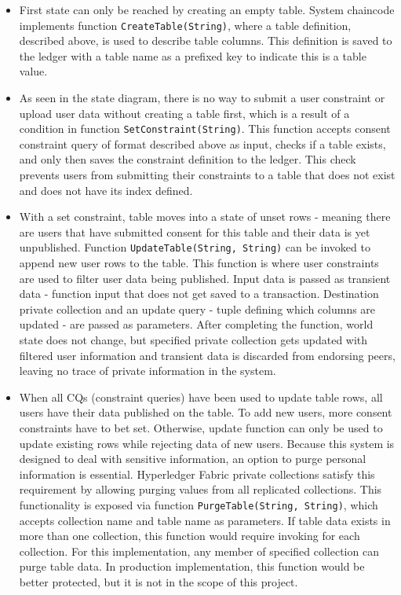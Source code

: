\documentclass[12pt]{article}
\begin{document}
    \begin{itemize}
        \item First state can only be reached by creating an empty table. System chaincode implements function \lstinline{CreateTable(String)}, where a table definition, described above, is used to describe table columns. This definition is saved to the ledger with a table name as a prefixed key to indicate this is a table value.

        \item As seen in the state diagram, there is no way to submit a user constraint or upload user data without creating a table first, which is a result of a condition in function \lstinline{SetConstraint(String)}. This function accepts consent constraint query of format described above as input, checks if a table exists, and only then saves the constraint definition to the ledger. This check prevents users from submitting their constraints to a table that does not exist and does not have its index defined.
        
        \item With a set constraint, table moves into a state of unset rows - meaning there are users that have submitted consent for this table and their data is yet unpublished. Function \lstinline{UpdateTable(String, String)} can be invoked to append new user rows to the table. This function is where user constraints are used to filter user data being published. Input data is passed as transient data - function input that does not get saved to a transaction. Destination private collection and an update query - tuple defining which columns are updated - are passed as parameters. After completing the function, world state does not change, but specified private collection gets updated with filtered user information and transient data is discarded from endorsing peers, leaving no trace of private information in the system.
        
        \item When all CQs (constraint queries) have been used to update table rows, all users have their data published on the table. To add new users, more consent constraints have to bet set. Otherwise, update function can only be used to update existing rows while rejecting data of new users. Because this system is designed to deal with sensitive information, an option to purge personal information is essential. Hyperledger Fabric private collections satisfy this requirement by allowing purging values from all replicated collections. This functionality is exposed via function \lstinline{PurgeTable(String, String)}, which accepts collection name and table name as parameters. If table data exists in more than one collection, this function would require invoking for each collection. For this implementation, any member of specified collection can purge table data. In production implementation, this function would be better protected, but it is not in the scope of this project.
    \end{itemize}
\end{document}
